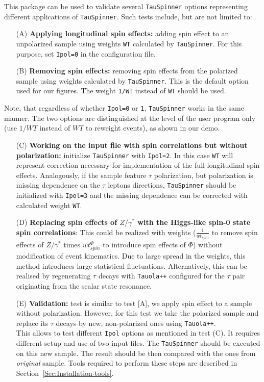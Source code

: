\documentclass{article}
\begin{document}
This package can be used to validate several {\tt TauSpinner} options representing different applications of
{\tt TauSpinner}. Such tests include, but are not limited to:
\begin{itemize}
\item[(A)] {\bf Applying longitudinal spin effects:} adding spin effect to an unpolarized sample
           using weights {\tt WT} calculated by {\tt TauSpinner}. For this purpose, set {\tt Ipol=0} in the configuration file.
\item[(B)] {\bf Removing spin effects:} removing spin effects from the polarized sample
           using weights calculated by {\tt TauSpinner}. This is the default option used for our figures.
           The weight {\tt 1/WT} instead of {\tt WT} should be used. 
\end{itemize}
Note, that  regardless of whether {\tt Ipol=0} or {\tt 1}, {\tt TauSpinner} works 
in the same manner.
The two options are distinguished  at the level of the  user program 
 only (use $1/WT$ instead of $WT$ to reweight events), as shown in our demo.
\begin{itemize}
\item[(C)] {\bf Working on the input file with spin correlations but without polarization:}
           initialize {\tt TauSpinner} with {\tt Ipol=2}. In this case {\tt WT} will represent
           correction necessary for implementation of the full longitudinal spin effects.
           Analogously, if the sample feature  $\tau$ polarization, but polarization
           is missing dependence on the $\tau$ leptons directions, {\tt TauSpinner} should be initialized with {\tt Ipol=3}
           and the missing dependence can be corrected with calculated weight  {\tt WT}.
\item[(D)] {\bf Replacing spin effects of $Z/\gamma^*$   with the Higgs-like spin-0 state spin correlations}: 
           This could be realized with weights ($\frac{1}{wt_{spin}}$ to remove spin effects of $Z/\gamma^*$ times $wt_{spin}^\Phi$ to introduce spin effects of $\Phi$)
           without modification of event kinematics. Due to large spread in the weights,
           this method introduces large statistical fluctuations.  
           Alternatively, this can be realised by regenerating  $\tau$ decays with {\tt Tauola++} 
           configured for the $\tau$ pair originating from the scalar state resonance.
\item[(E)] {\bf Validation:} test is similar to test [A], we apply spin effect to
           a sample without polarization. However, for this test we take the polarized sample and replace its $\tau$ decays
           by new, non-polarized ones using {\tt Tauola++}. \\
           This allows to test different {\tt Ipol} options as mentioned in test (C).
           It requires different setup and use of two input files. 
           The {\tt TauSpinner} should be executed on this new sample.
           The result should be then  compared with the ones from {\it original} sample.
           Tools required to perform these steps are described in Section~\ref{Sec:Installation-tools}.
\end{itemize}
\end{document}
